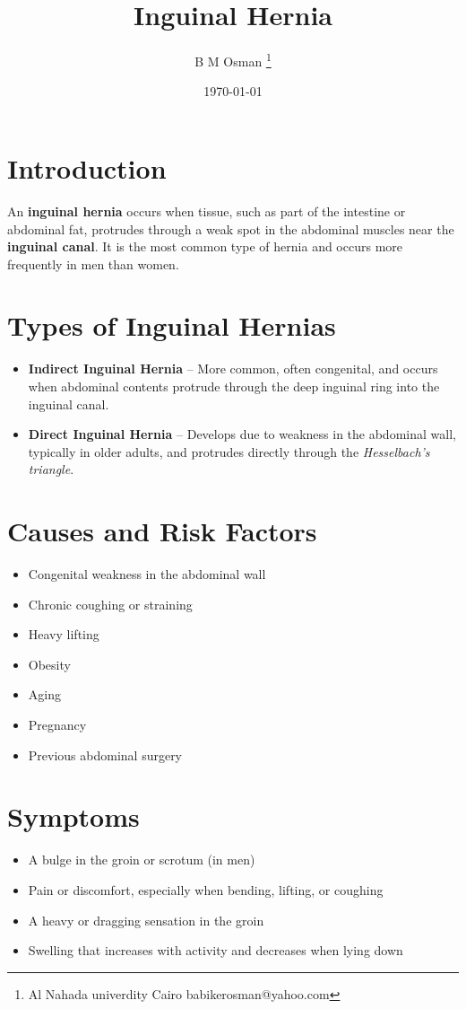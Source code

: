 \documentclass{article}
\title{Inguinal Hernia}
\author{B M Osman  \footnote {Al Nahada univerdity Cairo \email babikerosman@yahoo.com }}
\date{\today}
\begin{document}
\maketitle
\tableofcontents  

\section{Introduction}
An \textbf{inguinal hernia} occurs when tissue, such as part of the intestine or abdominal fat, protrudes through a weak spot in the abdominal muscles near the \textbf{inguinal canal}. It is the most common type of hernia and occurs more frequently in men than women.

\section{Types of Inguinal Hernias}
\begin{itemize}
    \item \textbf{Indirect Inguinal Hernia} – More common, often congenital, and occurs when abdominal contents protrude through the deep inguinal ring into the inguinal canal.
    \item \textbf{Direct Inguinal Hernia} – Develops due to weakness in the abdominal wall, typically in older adults, and protrudes directly through the \textit{Hesselbach's triangle}.
\end{itemize}

\section{Causes and Risk Factors}
\begin{itemize}
    \item Congenital weakness in the abdominal wall
    \item Chronic coughing or straining
    \item Heavy lifting
    \item Obesity
    \item Aging
    \item Pregnancy
    \item Previous abdominal surgery
\end{itemize}

\section{Symptoms}
\begin{itemize}
    \item A bulge in the groin or scrotum (in men)
    \item Pain or discomfort, especially when bending, lifting, or coughing
    \item A heavy or dragging sensation in the groin
    \item Swelling that increases with activity and decreases when lying down
\end{itemize}
\end{document}
